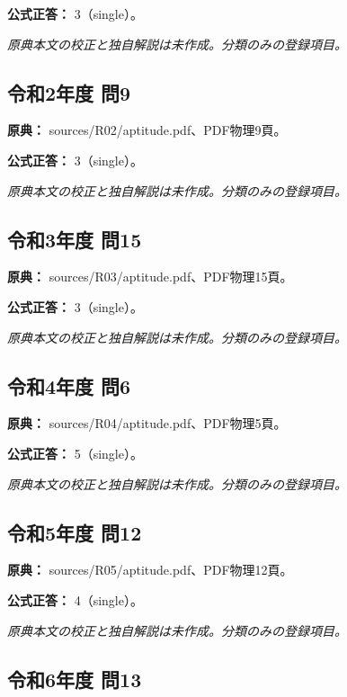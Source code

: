 \textbf{公式正答：} 3（single）。

\par\textit{原典本文の校正と独自解説は未作成。分類のみの登録項目。}

\subsection{令和2年度 問9}
\label{q:r02-reg-apt-09}

\noindent\textbf{原典：} sources/R02/aptitude.pdf、PDF物理9頁。

\textbf{公式正答：} 3（single）。

\par\textit{原典本文の校正と独自解説は未作成。分類のみの登録項目。}

\subsection{令和3年度 問15}
\label{q:r03-reg-apt-15}

\noindent\textbf{原典：} sources/R03/aptitude.pdf、PDF物理15頁。

\textbf{公式正答：} 3（single）。

\par\textit{原典本文の校正と独自解説は未作成。分類のみの登録項目。}

\subsection{令和4年度 問6}
\label{q:r04-reg-apt-06}

\noindent\textbf{原典：} sources/R04/aptitude.pdf、PDF物理5頁。

\textbf{公式正答：} 5（single）。

\par\textit{原典本文の校正と独自解説は未作成。分類のみの登録項目。}

\subsection{令和5年度 問12}
\label{q:r05-reg-apt-12}

\noindent\textbf{原典：} sources/R05/aptitude.pdf、PDF物理12頁。

\textbf{公式正答：} 4（single）。

\par\textit{原典本文の校正と独自解説は未作成。分類のみの登録項目。}

\subsection{令和6年度 問13}
\label{q:r06-reg-apt-13}

